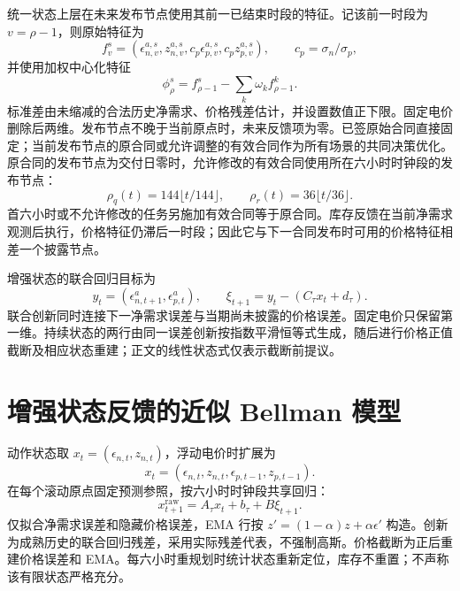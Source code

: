 \documentclass[UTF8,a4paper,zihao=-4,fontset=mac]{ctexart}
\begin{document}
统一状态上层在未来发布节点使用其前一已结束时段的特征。记该前一时段为 \(v=\rho-1\)，则原始特征为
\begin{equation}
f_v^s=(\epsilon_{n,v}^{a,s},z_{n,v}^{a,s},c_p\epsilon_{p,v}^{a,s},c_p z_{p,v}^{a,s}),
\qquad c_p=\sigma_n/\sigma_p,
\end{equation}
并使用加权中心化特征
\begin{equation}
\phi_\rho^s=f_{\rho-1}^s-\sum_k\omega_k f_{\rho-1}^k.
\end{equation}
标准差由未缩减的合法历史净需求、价格残差估计，并设置数值正下限。固定电价删除后两维。发布节点不晚于当前原点时，未来反馈项为零。已签原始合同直接固定；当前发布节点的原合同或允许调整的有效合同作为所有场景的共同决策优化。原合同的发布节点为交付日零时，允许修改的有效合同使用所在六小时时钟段的发布节点：
\begin{equation}
\rho_q(t)=144\lfloor t/144\rfloor,\qquad
\rho_r(t)=36\lfloor t/36\rfloor.
\end{equation}
首六小时或不允许修改的任务另施加有效合同等于原合同。库存反馈在当前净需求观测后执行，价格特征仍滞后一时段；因此它与下一合同发布时可用的价格特征相差一个披露节点。

增强状态的联合回归目标为
\begin{equation}
y_t=(\epsilon_{n,t+1}^{a},\epsilon_{p,t}^{a}),\qquad
\xi_{t+1}=y_t-(C_\tau x_t+d_\tau).
\end{equation}
联合创新同时连接下一净需求误差与当期尚未披露的价格误差。固定电价只保留第一维。持续状态的两行由同一误差创新按指数平滑恒等式生成，随后进行价格正值截断及相应状态重建；正文的线性状态式仅表示截断前提议。

\section{增强状态反馈的近似 Bellman 模型}\label{app:m1}
动作状态取 \(x_t=(\epsilon_{n,t},z_{n,t})\)，浮动电价时扩展为
\begin{equation}
x_t=(\epsilon_{n,t},z_{n,t},\epsilon_{p,t-1},z_{p,t-1}).
\end{equation}
在每个滚动原点固定预测参照，按六小时时钟段共享回归：
\begin{equation}
x_{t+1}^{\mathrm{raw}}=A_\tau x_t+b_\tau+B\xi_{t+1}.
\end{equation}
仅拟合净需求误差和隐藏价格误差，EMA 行按 \(z'=(1-\alpha)z+\alpha\epsilon'\) 构造。创新为成熟历史的联合回归残差，采用实际残差代表，不强制高斯。价格截断为正后重建价格误差和 EMA。每六小时重规划时统计状态重新定位，库存不重置；不声称该有限状态严格充分。
\end{document}
